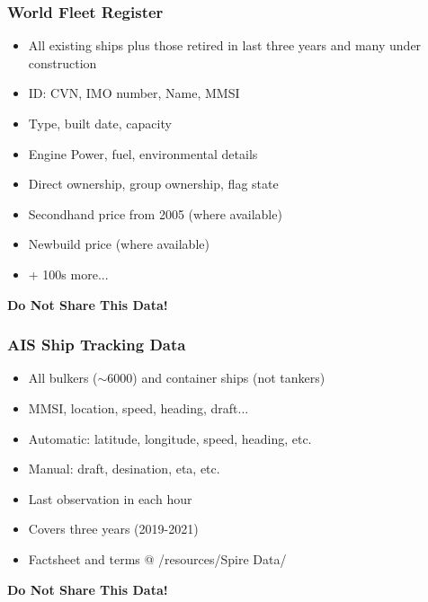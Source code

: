 \documentclass{beamer}
\begin{document}
\begin{frame}
\frametitle{World Fleet Register}

\begin{itemize}
\setlength{\itemsep}{0.5\baselineskip}
    \item All existing ships plus those retired in last three years and many under construction
	\item ID: CVN, IMO number, Name, MMSI
    \item Type, built date, capacity
    \item Engine Power, fuel, environmental details
	\item Direct ownership, group ownership, flag state
    \item Secondhand price from 2005 (where available)
	\item Newbuild price (where available)
	\item + 100s more...
\end{itemize}

\begin{center}
    \textbf{Do Not Share This Data!}
\end{center}
\end{frame}


\begin{frame}
\frametitle{AIS Ship Tracking Data}

\begin{itemize}
    \item All bulkers ($\sim$6000) and container ships (not tankers)
	\item MMSI, location, speed, heading, draft...
	\item Automatic: latitude, longitude, speed, heading, etc.
	\item Manual: draft, desination, eta, etc.
	\item Last observation in each hour
    \item Covers three years (2019-2021)
	\item Factsheet and terms @ /resources/Spire Data/
\end{itemize}

\begin{center}
    \textbf{Do Not Share This Data!}
\end{center}
\end{frame}

\end{document}
